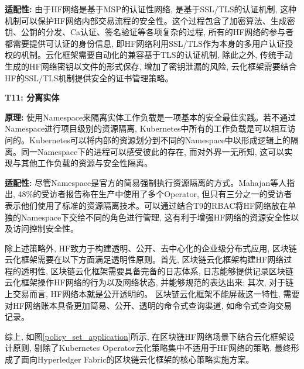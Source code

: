 \textbf{适配性: }由于HF网络是基于MSP的认证性网络, 是基于SSL/TLS的认证机制, 这种机制可以保护HF网络内部交易流程的安全性。这个过程包含了加密算法、生成密钥、公钥的分发、Ca认证、签名验证等各项复杂的过程, 所有的HF网络的参与者都需要提供可认证的身份信息, 即HF网络利用SSL/TLS作为本身的多用户认证授权的机制。云化框架需要自动化的兼容基于TLS的认证机制, 除此之外, 传统手动生成的HF网络密钥以文件的形式保存, 增加了密钥泄漏的风险, 云化框架需要结合HF的SSL/TLS机制提供安全的证书管理策略。


\textbf{T11: 分离实体}

\textbf{原理: }使用Namespace来隔离实体工作负载是一项基本的安全最佳实践。若不通过Namespace进行项目级别的资源隔离, Kubernetes中所有的工作负载是可以相互访问的。Kubernetes可以将内部的资源划分到不同的Namespace中以形成逻辑上的隔离。同一Namespace下的进程可以感受彼此的存在, 而对外界一无所知, 这可以实现与其他工作负载的资源与安全性隔离。

\textbf{适配性: }尽管Namespace是官方的简易强制执行资源隔离的方式。Mahajan等人\cite{mahajan2020suture}指出, 48\%的受访者报告称在生产中使用了多个Operator, 但只有三分之一的受访者表示他们使用了标准的资源隔离技术。可以通过结合T9的RBAC将HF网络放在单独的Namespace下交给不同的角色进行管理, 这有利于增强HF网络的资源安全性以及访问控制安全性。

除上述策略外, HF致力于构建透明、公开、去中心化的企业级分布式应用, 区块链云化框架需要在以下方面满足透明性原则。首先, 区块链云化框架构建HF网络过程的透明性, 区块链云化框架需要具备完备的日志体系, 日志能够提供记录区块链云化框架操作HF网络的行为以及网络状态, 并能够规范的表达出来; 其次, 对于链上交易而言, HF网络本就是公开透明的。 区块链云化框架不能屏蔽这一特性, 需要对HF网络账本具备更加简易、公开、透明的命令式查询渠道, 如命令式查询交易记录。

综上, 如图\ref{policy_set_application}所示, 在区块链HF网络场景下结合云化框架设计原则, 剔除了Kubernetes Operator云化策略集中不适用于HF网络的策略, 最终形成了面向Hyperledger Fabric的区块链云化框架的核心策略实施方案。

